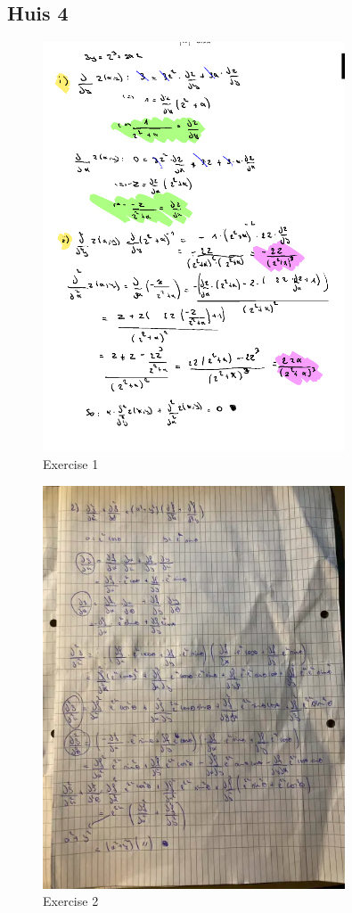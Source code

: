 \documentclass[a4paper]{article}
\begin{document}
\subsection*{Huis 4}

\begin{figure}[H]
	\centering
	\includegraphics[width=0.8\textwidth]{assets/huis_4_ex_1.png}
	\caption{Exercise 1}
	\label{fig:huis_4_ex_1}
\end{figure}

\begin{figure}[H]
	\centering
	\includegraphics[width=0.8\textwidth]{assets/huis_4_ex_2.png}
	\caption{Exercise 2}
	\label{fig:huis_4_ex_2}
\end{figure}
\end{document}
